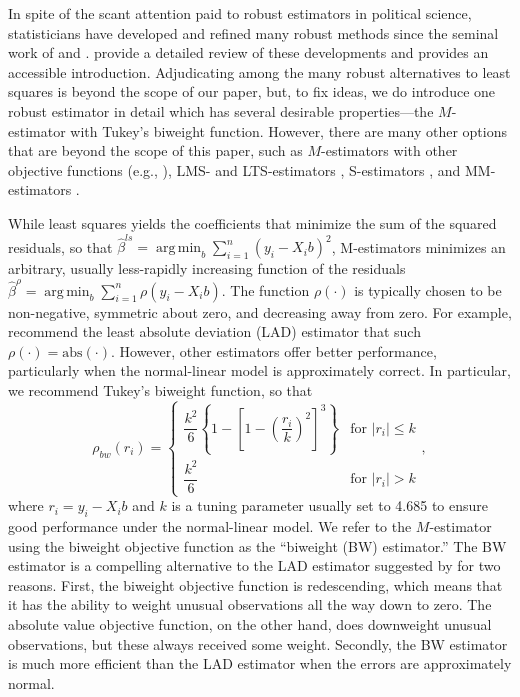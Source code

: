 \documentclass[12pt]{article}
\DeclareMathOperator*{\argmin}{arg\,min}
\begin{document}
In spite of the scant attention paid to robust estimators in political science, statisticians have developed and refined many robust methods since the seminal work of \cite{Box1953} and \cite{Huber1964}. 
\cite{HuberRonchetti2009} provide a detailed review of these developments and \cite{Anderson2008} provides an accessible introduction. 
Adjudicating among the many robust alternatives to least squares is beyond the scope of our paper, but, to fix ideas, we do introduce one robust estimator in detail which has several desirable properties---the $M$-estimator with Tukey's biweight function. 
However, there are many other options that are beyond the scope of this paper, such as $M$-estimators with other objective functions (e.g., \citealt{Huber1973}), LMS- and LTS-estimators \citep{Rousseeuw1984}, S-estimators \citep{RousseeuwYohai1984}, and MM-estimators \citep{Yohai1987}.

While least squares yields the coefficients that minimize the sum of the squared residuals, so that $\hat{\beta}^{ls} =\argmin_{b} \sum_{i = 1}^n (y_i - X_ib)^2$, M-estimators minimizes an arbitrary, usually less-rapidly increasing function of the residuals $\hat{\beta}^{\rho} =\argmin_{b} \sum_{i = 1}^n \rho(y_i - X_ib)$. 
The function $\rho(\cdot)$ is typically chosen to be non-negative, symmetric about zero, and decreasing away from zero. 
For example, \cite{HardenDesmarais2011} recommend the least absolute deviation (LAD) estimator \citep{Dodge1987} that such $\rho(\cdot) = \text{abs}(\cdot)$. 
However, other estimators offer better performance, particularly when the normal-linear model is approximately correct. 
In particular, we recommend Tukey's biweight function, so that
\begin{displaymath}
   \rho_{bw}(r_i) = \left\{
     \begin{array}{lr}
       \dfrac{k^2}{6}\left\{ 1 - \left[ 1 - \left( \dfrac{r_i}{k} \right)^2 \right]^3\right\} & \text{for } |r_i| \leq k\\
        \dfrac{k^2}{6} & \text{for } |r_i| > k 
\end{array}
   \right.,
\end{displaymath}
\noindent where $r_i = y_i - X_ib$ and $k$ is a tuning parameter usually set to 4.685 to ensure good performance under the normal-linear model. 
We refer to the $M$-estimator using the biweight objective function as the ``biweight (BW) estimator.'' 
The BW estimator is a compelling alternative to the LAD estimator suggested by \cite{HardenDesmarais2011} for two reasons. 
First, the biweight objective function is redescending, which means that it has the ability to weight unusual observations all the way down to zero. 
The absolute value objective function, on the other hand, does downweight unusual observations, but these always received some weight. 
Secondly, the BW estimator is much more efficient than the LAD estimator when the errors are approximately normal. 
\end{document}

